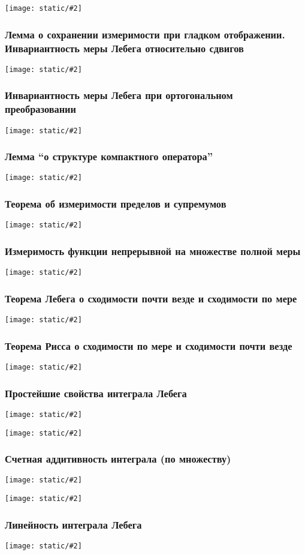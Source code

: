 \documentclass{article}
\def\images#1#2{\begin{center}\texttt{[image: static/\#2]}\end{center}}
\begin{document}
\images{0.93}{soh_nepr_otob.jpg}

\subsubsection{Лемма о сохранении измеримости при гладком отображении. Инвариантность меры Лебега относительно сдвигов}

\images{0.93}{soh_gl_otob.jpg}

\subsubsection{Инвариантность меры Лебега при ортогональном преобразовании}

\images{0.95}{inv_mer_leb_ort.jpg}

\subsubsection{Лемма ``о структуре компактного оператора''}

\images{0.95}{str_komp_op.jpg}

\subsubsection{Теорема об измеримости пределов и супремумов}

\images{0.95}{iz_sup.jpg}

\subsubsection{Измеримость функции непрерывной на множестве полной меры}

\images{0.95}{iz_mn_mer_0.jpg}

\subsubsection{Теорема Лебега о сходимости почти везде и сходимости по мере}

\images{0.95}{teor_leb.jpg}

\subsubsection{Теорема Рисса о сходимости по мере и сходимости почти везде}

\images{0.95}{teor_rissa.jpg}

\subsubsection{Простейшие свойства интеграла Лебега}

\images{0.95}{pr_sv_int_leb_1.jpg}

\images{0.95}{pr_sv_int_leb_2.jpg}

\subsubsection{Счетная аддитивность интеграла (по множеству)}

\images{0.95}{sch_add_1.jpg}

\images{0.95}{sch_add_2.jpg}

\subsubsection{Линейность интеграла Лебега}

\images{0.95}{lin_int_leb.jpg}

\newpage 
\end{document}

